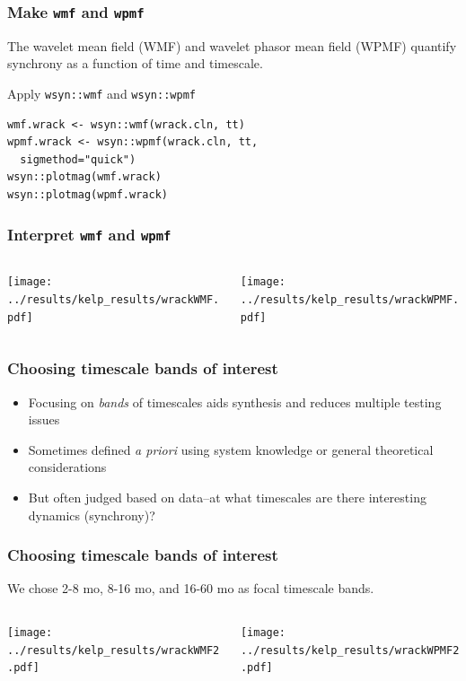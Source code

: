 \documentclass{beamer}
\begin{document}
\begin{frame}[fragile]
\frametitle{Make \texttt{wmf} and \texttt{wpmf}}
The wavelet mean field (WMF) and wavelet phasor mean field (WPMF) quantify synchrony as a function of time and timescale.
\begin{exampleblock}{Apply \texttt{wsyn::wmf} and \texttt{wsyn::wpmf}}
\begin{verbatim}
wmf.wrack <- wsyn::wmf(wrack.cln, tt)
wpmf.wrack <- wsyn::wpmf(wrack.cln, tt, 
  sigmethod="quick")
wsyn::plotmag(wmf.wrack)
wsyn::plotmag(wpmf.wrack)
\end{verbatim}
\end{exampleblock}
\end{frame}

\begin{frame}[fragile]
\frametitle{Interpret \texttt{wmf} and \texttt{wpmf}}
\begin{columns}[c]
\begin{column}{6cm}
\texttt{[image: ../results/kelp\_results/wrackWMF.pdf]}
\end{column}
\begin{column}{6cm}
\texttt{[image: ../results/kelp\_results/wrackWPMF.pdf]}
\end{column}
\end{columns}
\end{frame}

\begin{frame}
\frametitle{Choosing timescale bands of interest}
\begin{itemize}
\item Focusing on \textit{bands} of timescales aids synthesis and reduces multiple testing issues
\item Sometimes defined \textit{a priori} using system knowledge or general theoretical considerations
\item But often judged based on data--at what timescales are there interesting dynamics (synchrony)?
\end{itemize}
\end{frame}

\begin{frame}[fragile]
\frametitle{Choosing timescale bands of interest}
We chose 2-8 mo, 8-16 mo, and 16-60 mo as focal timescale bands.
\begin{columns}[c]
\begin{column}{6cm}
\texttt{[image: ../results/kelp\_results/wrackWMF2.pdf]}
\end{column}
\begin{column}{6cm}
\texttt{[image: ../results/kelp\_results/wrackWPMF2.pdf]}
\end{column}
\end{columns}
\end{frame}
\end{document}
